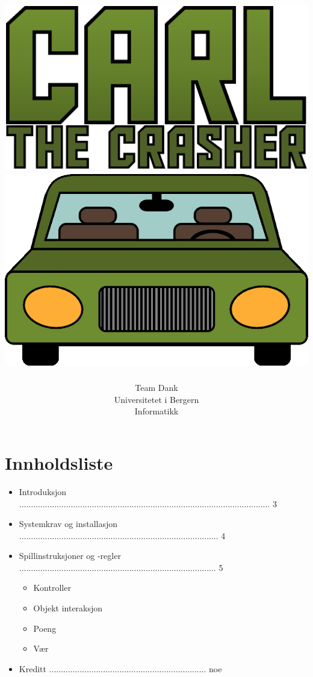 \documentclass[paper=a4]{article}
\begin{document}
\title{ \normalsize \includegraphics[scale=0.43]{images/CarGameLogo.png}
	\\
	\includegraphics[scale=0.5]{images/menu_car.png}
}
\author{Team Dank \\
Universitetet i Bergern \\
Informatikk}
\maketitle
\newpage

\section{Innholdsliste}
\begin{itemize}
	\item Introduksjon ........................................................................................................... 3
	\item Systemkrav og installasjon ..................................................................................... 4
	\item Spillinstruksjoner og -regler .................................................................................... 5
		\begin{itemize} 
			\item Kontroller
			\item Objekt interaksjon
			\item Poeng
			\item Vær
		\end{itemize}
	\item Kreditt ................................................................... noe
\end{itemize}
\newpage
\end{document}
